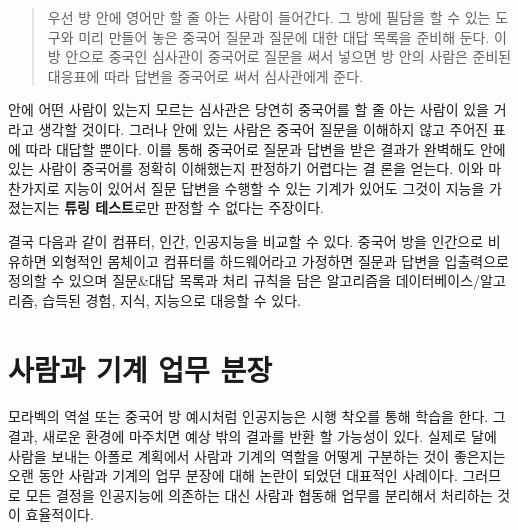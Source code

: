 \documentclass[smallextended]{svjour3}       %
\begin{document}
\begin{quote}
우선 방 안에 영어만 할 줄 아는 사람이 들어간다. 그 방에 필담을 할 수
있는 도구와 미리 만들어 놓은 중국어 질문과 질문에 대한 대답 목록을
준비해 둔다. 이 방 안으로 중국인 심사관이 중국어로 질문을 써서 넣으면 방
안의 사람은 준비된 대응표에 따라 답변을 중국어로 써서 심사관에게 준다.
\end{quote}

안에 어떤 사람이 있는지 모르는 심사관은 당연히 중국어를 할 줄 아는
사람이 있을 거라고 생각할 것이다. 그러나 안에 있는 사람은 중국어 질문을
이해하지 않고 주어진 표에 따라 대답할 뿐이다. 이를 통해 중국어로 질문과
답변을 받은 결과가 완벽해도 안에 있는 사람이 중국어를 정확히 이해했는지
판정하기 어렵다는 결 론을 얻는다. 이와 마찬가지로 지능이 있어서 질문
답변을 수행할 수 있는 기계가 있어도 그것이 지능을 가졌는지는
\textbf{튜링 테스트}로만 판정할 수 없다는 주장이다.

\begin{table}[H]
\centering
{}
\end{table}

결국 다음과 같이 컴퓨터, 인간, 인공지능을 비교할 수 있다. 중국어 방을
인간으로 비유하면 외형적인 몸체이고 컴퓨터를 하드웨어라고 가정하면
질문과 답변을 입출력으로 정의할 수 있으며 질문\&대답 목록과 처리 규칙을
담은 알고리즘을 데이터베이스/알고리즘, 습득된 경험, 지식, 지능으로
대응할 수 있다.

\hypertarget{man-human-boundary}{%
\section{사람과 기계 업무 분장}\label{man-human-boundary}}

모라벡의 역설 또는 중국어 방 예시처럼 인공지능은 시행 착오를 통해 학습을
한다. 그 결과, 새로운 환경에 마주치면 예상 밖의 결과를 반환 할 가능성이
있다. 실제로 달에 사람을 보내는 아폴로 계획에서 사람과 기계의 역할을
어떻게 구분하는 것이 좋은지는 오랜 동안 사람과 기계의 업무 분장에 대해
논란이 되었던 대표적인 사례이다. 그러므로 모든 결정을 인공지능에
의존하는 대신 사람과 협동해 업무를 분리해서 처리하는 것이 효율적이다.
\end{document}
